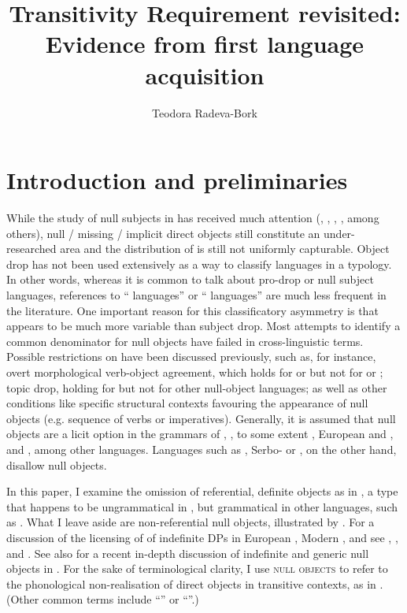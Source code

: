 \documentclass[output=paper,modfonts,newtxmath,hidelinks,]{langscibook}
\title{Transitivity Requirement revisited: Evidence from first language acquisition}
\author{Teodora Radeva-Bork\affiliation{University of Potsdam}}
\begin{document}
\maketitle
{}

\section{Introduction and preliminaries}\label{17:sec:key:1}

While the study of null subjects in  has received much attention (\citealt{Franks1995}, \citealt{Lindseth1998}, \citealt{Fehrmann-Junghanns2008}, \citealt{Müller2006}, among others), null / missing / implicit direct objects still constitute an under-researched area and the distribution of  is still not uniformly capturable. Object drop has not been used extensively as a way to classify languages in a typology. In other words, whereas it is common to talk about pro-drop or null subject languages, references to “ languages” or “ languages” are much less frequent in the literature. One important reason for this classificatory asymmetry is that  appears to be much more variable than subject drop. Most attempts to identify a common denominator for null objects have failed in cross-linguistic terms. Possible restrictions on  have been discussed previously, such as, for instance, overt morphological verb-object agreement, which holds for  or  but not for  or ; topic drop, holding for  but not for other null-object languages; as well as other conditions like specific structural contexts favouring the appearance of null objects (e.g. sequence of verbs or imperatives). Generally, it is assumed that null objects are a licit option in the grammars of , , to some extent , European and , and , among other languages. Languages such as , Serbo- or , on the other hand, disallow null objects.

In this paper, I examine the omission of referential, definite objects as in , a type that happens to be ungrammatical in  , but grammatical in other languages, such as  . What I leave aside are non-referential null objects, illustrated by . For a discussion of the licensing of  of indefinite DPs in European , Modern , and  see \citet{Campos1986}, \citet{Giannakidou-Merchant1997}, and \citet{Dimitriadis1994}. See also \citet{dvorak17} for a recent in-depth discussion of indefinite and generic null objects in . For the sake of terminological clarity, I use \textsc{null objects} to refer to the phonological non-realisation of direct objects in transitive contexts, as in . (Other common terms include “” or “”.)
\end{document}
